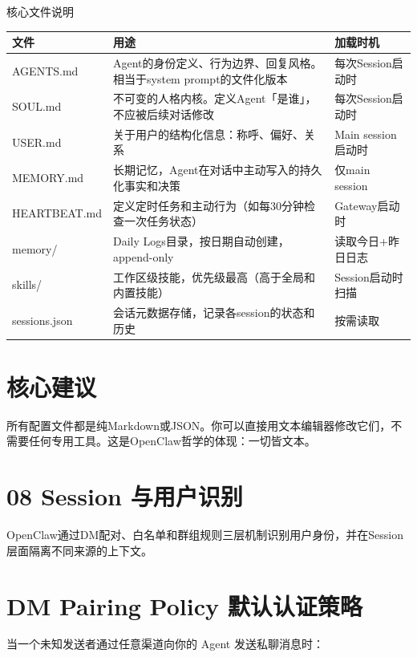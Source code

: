 \documentclass[
  10
]{article}
\newcounter{none} %
\begin{document}
核心文件说明

{\def\LTcaptype{none} %
\begin{longtable}[]{@{}|l|l|l|@{}}
\toprule\noalign{}
\endhead
\bottomrule\noalign{}
\endlastfoot
\hline
文件 & 用途 & 加载时机 \\
\hline
AGENTS.md & Agent的身份定义、行为边界、回复风格。相当于system
prompt的文件化版本 & 每次Session启动时 \\
\hline
SOUL.md & 不可变的人格内核。定义Agent「是谁」，不应被后续对话修改 &
每次Session启动时 \\
\hline
USER.md & 关于用户的结构化信息：称呼、偏好、关系 & Main session启动时 \\
\hline
MEMORY.md & 长期记忆，Agent在对话中主动写入的持久化事实和决策 & 仅main
session \\
\hline
HEARTBEAT.md & 定义定时任务和主动行为（如每30分钟检查一次任务状态） &
Gateway启动时 \\
\hline
memory/ & Daily Logs目录，按日期自动创建，append-only &
读取今日+昨日日志 \\
\hline
skills/ & 工作区级技能，优先级最高（高于全局和内置技能） &
Session启动时扫描 \\
\hline
sessions.json & 会话元数据存储，记录各session的状态和历史 & 按需读取 \\
\hline
\end{longtable}
}

\section{核心建议}\label{ux6838ux5fc3ux5efaux8bae-2}

所有配置文件都是纯Markdown或JSON。你可以直接用文本编辑器修改它们，不需要任何专用工具。这是OpenClaw哲学的体现：一切皆文本。

\section{08 Session
与用户识别}\label{session-ux4e0eux7528ux6237ux8bc6ux522b}

OpenClaw通过DM配对、白名单和群组规则三层机制识别用户身份，并在Session层面隔离不同来源的上下文。

\section{DM Pairing Policy
默认认证策略}\label{dm-pairing-policy-ux9ed8ux8ba4ux8ba4ux8bc1ux7b56ux7565}

当一个未知发送者通过任意渠道向你的 Agent 发送私聊消息时：
\end{document}
